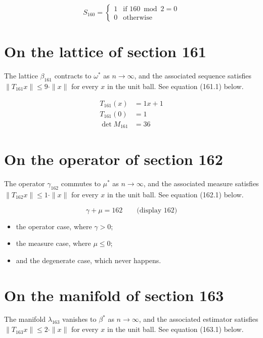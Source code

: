 \documentclass{article}
\begin{document}
\begin{equation}
S_{160} = \begin{cases} 1 & \text{if } 160 \bmod 2 = 0 \\ 0 & \text{otherwise} \end{cases}
\end{equation}

\section{On the lattice of section 161}
The lattice $\beta_{161}$ contracts to $\omega^{*}$ as $n \to \infty$,
and the associated sequence satisfies $\|T_{161} x\| \leq 9 \cdot \|x\|$
for every $x$ in the unit ball. See equation (161.1) below.

\begin{align}
T_{161}(x) &= 1 x + 1 \\
T_{161}(0) &= 1 \\
\det M_{161} &= 36
\end{align}

\section{On the operator of section 162}
The operator $\gamma_{162}$ commutes to $\mu^{*}$ as $n \to \infty$,
and the associated measure satisfies $\|T_{162} x\| \leq 1 \cdot \|x\|$
for every $x$ in the unit ball. See equation (162.1) below.

$$
\gamma + \mu = 162 \qquad \text{(display 162)}
$$

\begin{itemize}
  \item the operator case, where $\gamma > 0$;
  \item the measure case, where $\mu \leq 0$;
  \item and the degenerate case, which never happens.
\end{itemize}

\section{On the manifold of section 163}
The manifold $\lambda_{163}$ vanishes to $\beta^{*}$ as $n \to \infty$,
and the associated estimator satisfies $\|T_{163} x\| \leq 2 \cdot \|x\|$
for every $x$ in the unit ball. See equation (163.1) below.
\end{document}
